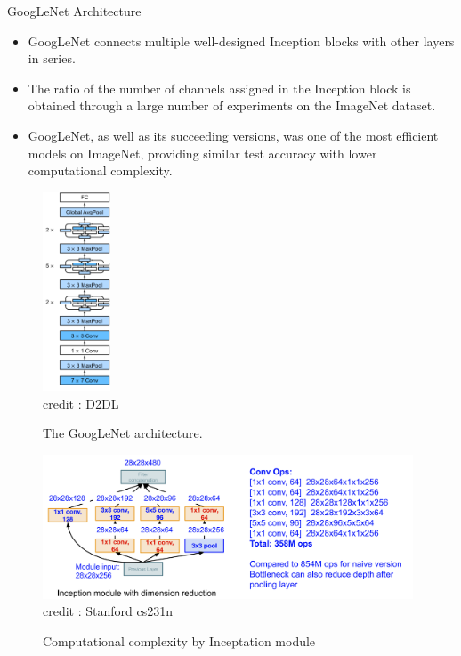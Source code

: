 \begin{vbframe}{GoogLeNet Architecture}
    \begin{itemize}
        \item GoogLeNet connects multiple well-designed Inception blocks with other layers in series. 
        \item The ratio of the number of channels assigned in the Inception block is obtained through a large number of experiments on the ImageNet dataset.
        \item GoogLeNet, as well as its succeeding versions, was one of the most efficient models on ImageNet, providing similar test accuracy with lower computational complexity.
    \end{itemize}
    
\framebreak

\begin{figure}
  \centering
    \includegraphics[width=2cm]{plots/moderncnn/inception-full.png}
    \tiny{\\ credit : D2DL}
    \caption{The GoogLeNet architecture.}
\end{figure}
    
    
\begin{figure}
  \centering
    \includegraphics[width=11cm]{plots/moderncnn/inception_detail.png}
    \tiny{\\ credit : Stanford cs231n}
    \caption{Computational complexity by Inceptation module }
\end{figure}
    
\end{vbframe}


